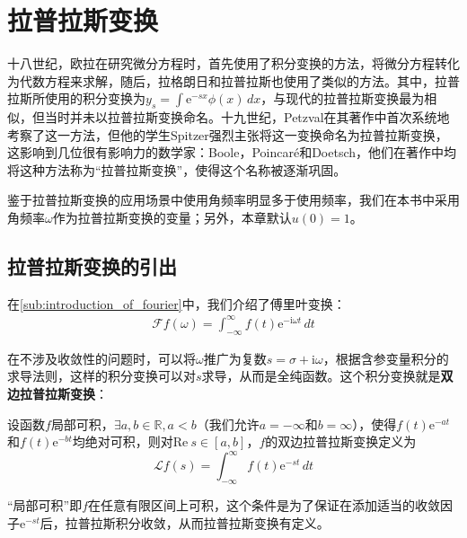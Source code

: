 \section{拉普拉斯变换}\label{sec:Laplace_Transform}

十八世纪，欧拉在研究微分方程时，首先使用了积分变换的方法，将微分方程转化为代数方程来求解，随后，拉格朗日和拉普拉斯也使用了类似的方法。其中，拉普拉斯所使用的积分变换为$y_s=\int \mathrm{e}^{-sx}\phi(x)\,dx$，与现代的拉普拉斯变换最为相似，但当时并未以拉普拉斯变换命名。十九世纪，Petzval在其著作中首次系统地考察了这一方法，但他的学生Spitzer强烈主张将这一变换命名为拉普拉斯变换，这影响到几位很有影响力的数学家：Boole，Poincaré和Doetsch，他们在著作中均将这种方法称为“拉普拉斯变换”，使得这个名称被逐渐巩固。


鉴于拉普拉斯变换的应用场景中使用角频率明显多于使用频率，我们在本书中采用角频率$\omega$作为拉普拉斯变换的变量；另外，本章默认$u(0)=1$。

\subsection{拉普拉斯变换的引出}\label{sub:introduction_of_laplace}
在\ref{sub:introduction_of_fourier}中，我们介绍了傅里叶变换：\begin{align*}
    \mathcal{F} f(\omega)=\int_{-\infty}^{\infty}f(t)\mathrm{e}^{-\mathrm{i}\omega t}\,dt
\end{align*}

在不涉及收敛性的问题时，可以将$\omega$推广为复数$s=\sigma+\mathrm{i}\omega$，根据含参变量积分的求导法则，这样的积分变换可以对$s$求导，从而是全纯函数。这个积分变换就是\textbf{双边拉普拉斯变换}：
\begin{definition}[双边拉普拉斯变换]
    设函数$f$局部可积，$\exists a,b\in\mathbb{R},a<b$（我们允许$a=-\infty$和$b=\infty$），使得$f(t)\mathrm{e}^{-at}$和$f(t)\mathrm{e}^{-bt}$均绝对可积，则对$\text{Re}\ s\in[a,b]$，$f$的双边拉普拉斯变换定义为
    \[\mathcal{L}f(s)=\int_{-\infty}^{\infty}f(t)\mathrm{e}^{-st}\,dt\]
\end{definition}
“局部可积”即$f$在任意有限区间上可积，这个条件是为了保证在添加适当的收敛因子$\mathrm{e}^{-st}$后，拉普拉斯积分收敛，从而拉普拉斯变换有定义。

